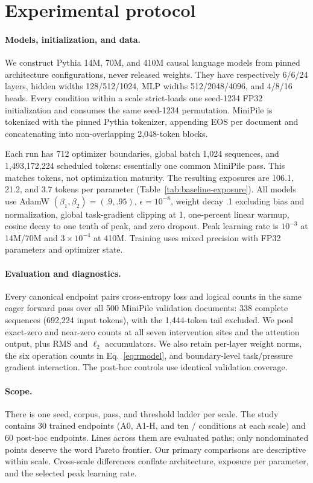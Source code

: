 \section{Experimental protocol}
\label{sec:experiments}

\paragraph{Models, initialization, and data.}
We construct Pythia 14M, 70M, and 410M causal language models from pinned
architecture configurations, never released weights.  They have respectively
6/6/24 layers, hidden widths 128/512/1024, MLP widths 512/2048/4096, and
4/8/16 heads.  Every condition within a scale strict-loads one seed-1234 FP32
initialization and consumes the same seed-1234 permutation.  MiniPile
\citep{kaddour2023minipile} is tokenized with the pinned Pythia tokenizer,
appending EOS per document and concatenating into non-overlapping 2,048-token
blocks.

Each run has 712 optimizer boundaries, global batch 1,024 sequences, and
1,493,172,224 scheduled tokens: essentially one common MiniPile pass.  This
matches tokens, not optimization maturity.  The resulting exposures are 106.1,
21.2, and 3.7 tokens per parameter (Table~\ref{tab:baseline-exposure}).  All
models use AdamW $(\beta_1,\beta_2)=(.9,.95)$, $\epsilon=10^{-8}$, weight decay
.1 excluding bias and normalization, global task-gradient clipping at 1,
one-percent linear warmup, cosine decay to one tenth of peak, and zero dropout.
Peak learning rate is $10^{-3}$ at 14M/70M and $3\times10^{-4}$ at 410M.
Training uses mixed precision with FP32 parameters and optimizer state.



\paragraph{Evaluation and diagnostics.}
Every canonical endpoint pairs cross-entropy loss and logical counts in the
same eager forward pass over all 500 MiniPile validation documents: 338
complete sequences (692,224 input tokens), with the 1,444-token tail excluded.
We pool exact-zero and near-zero counts at all seven intervention sites and the
attention output, plus RMS and $\ell_2$ accumulators.  We also retain per-layer
weight norms, the six operation counts in Eq.~\ref{eq:rmodel}, and boundary-level
task/pressure gradient interaction.  The post-hoc controls use identical
validation coverage.

\paragraph{Scope.}
There is one seed, corpus, pass, and threshold ladder per scale.  The study
contains 30 trained endpoints (A0, A1-H, and ten \Afour/\Aseven{} conditions at
each scale) and 60 post-hoc endpoints.  Lines across them are evaluated paths;
only nondominated points deserve the word Pareto frontier.  Our primary
comparisons are descriptive within scale.  Cross-scale differences conflate
architecture, exposure per parameter, and the selected peak learning rate.

